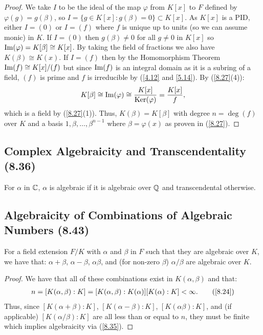 \begin{proof}
    We take $I$ to be the ideal of the map $\varphi$ from $K[x]$ to $F$ defined by
    $\varphi(g) = g(\beta)$, so $I = \{g \in K[x] : g(\beta) = 0\} \subset K[x]$.
    As $K[x]$ is a PID, either $I = (0)$ or $I = (f)$ where $f$ is unique up to units
    (so we can assume monic) in $K$.
    \bs
    If $I = (0)$ then $g(\beta) \neq 0$ for all $g \neq 0$ in $K[x]$ so 
    $\operatorname{Im}(\varphi) = K[\beta] \cong K[x]$. By taking the field of fractions we also
    have $K(\beta) \cong K(x)$.
    \bs
    If $I = (f)$ then by the Homomorphism Theorem $\operatorname{Im}(f) \cong K[x] / (f)$ 
    but since $\operatorname{Im}(f)$ is an integral domain as it is a subring of a field,
    $(f)$ is prime and $f$ is irreducible by (\ref{4.12} and \ref{5.14}).
    By (\ref{8.27}(4)): \begin{align*}
        K[\beta] \cong \operatorname{Im}(\varphi) \cong \frac{K[x]}{\operatorname{Ker}(\varphi)} = \frac{K[x]}{f},
    \end{align*} which is a field by (\ref{8.27}(1)). Thus, $K(\beta) = K[\beta]$
    with degree $n = \deg(f)$ over $K$ and a basis $1, \beta, \ldots, \beta^{n - 1}$
    where $\beta = \varphi(x)$ as proven in (\ref{8.27}).
\end{proof}

\subsection{Complex Algebraicity and Transcendentality (8.36)} \label{8.36}

For $\alpha$ in $\mathbb{C}$, $\alpha$ is algebraic if it is algebraic over $\mathbb{Q}$
and transcendental otherwise.

\subsection{Algebraicity of Combinations of Algebraic Numbers (8.43)} \label{8.43}

For a field extension $F / K$ with $\alpha$ and $\beta$ in $F$ such that they are algebraic
over $K$, we have that: $\alpha + \beta$, $\alpha - \beta$, $\alpha\beta$, and
(for non-zero $\beta$) $\alpha / \beta$ are algebraic over $K$.

\begin{proof}
    We have that all of these combinations exist in $K(\alpha, \beta)$ and that: \begin{align*}
        n = [K(\alpha, \beta) : K] = [K(\alpha, \beta) : K(\alpha)][K(\alpha) : K] < \infty. 
        \tag{\ref{8.24}}
    \end{align*} Thus, since $[K(\alpha + \beta) : K]$, $[K(\alpha - \beta) : K]$,
    $[K(\alpha\beta) : K]$, and (if applicable) $[K(\alpha / \beta) : K]$ are all less than
    or equal to $n$, they must be finite which implies algebraicity via (\ref{8.35}).
\end{proof}

